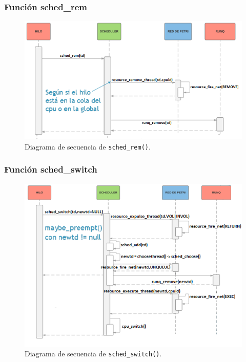 \documentclass[a4paper]{book}
\begin{document}
\subsubsection{Funci\'on sched\_rem}

\begin{figure} [H]
	\begin{center}
        \includegraphics[scale=0.75]{./imagenes/sched_rem.png}
		\cprotect\caption{Diagrama de secuencia de \verb|sched_rem()|.}
	\end{center}
\end{figure}

\subsubsection{Funci\'on sched\_switch}

\begin{figure} [H]
	\begin{center}
        \includegraphics[scale=0.85]{./imagenes/sched_switch.png}
		\cprotect\caption{Diagrama de secuencia de \verb|sched_switch()|.}
	\end{center}
\end{figure}
\end{document}
